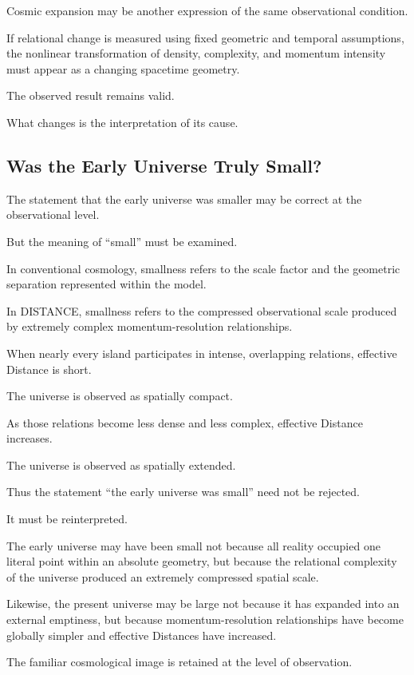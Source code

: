 Cosmic expansion may be another expression of the same observational condition.

If relational change is measured using fixed geometric and temporal assumptions, the nonlinear transformation of density, complexity, and momentum intensity must appear as a changing spacetime geometry.

The observed result remains valid.

What changes is the interpretation of its cause.

\subsection*{\textbf{Was the Early Universe Truly Small?}}

The statement that the early universe was smaller may be correct at the observational level.

But the meaning of “small” must be examined.

In conventional cosmology, smallness refers to the scale factor and the geometric separation represented within the model.

In DISTANCE, smallness refers to the compressed observational scale produced by extremely complex momentum-resolution relationships.

When nearly every island participates in intense, overlapping relations, effective Distance is short.

The universe is observed as spatially compact.

As those relations become less dense and less complex, effective Distance increases.

The universe is observed as spatially extended.

Thus the statement “the early universe was small” need not be rejected.

It must be reinterpreted.

The early universe may have been small not because all reality occupied one literal point within an absolute geometry, but because the relational complexity of the universe produced an extremely compressed spatial scale.

Likewise, the present universe may be large not because it has expanded into an external emptiness, but because momentum-resolution relationships have become globally simpler and effective Distances have increased.

The familiar cosmological image is retained at the level of observation.

